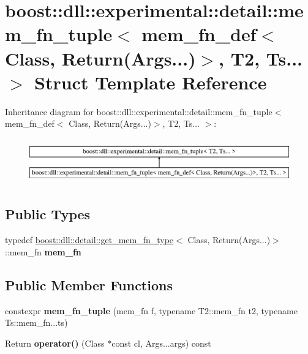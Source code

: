 \hypertarget{a00222}{}\section{boost\+:\+:dll\+:\+:experimental\+:\+:detail\+:\+:mem\+\_\+fn\+\_\+tuple$<$ mem\+\_\+fn\+\_\+def$<$ Class, Return(Args...)$>$, T2, Ts... $>$ Struct Template Reference}
\label{a00222}
Inheritance diagram for boost\+:\+:dll\+:\+:experimental\+:\+:detail\+:\+:mem\+\_\+fn\+\_\+tuple$<$ mem\+\_\+fn\+\_\+def$<$ Class, Return(Args...)$>$, T2, Ts... $>$\+:\begin{figure}[H]
\begin{center}
\leavevmode
\includegraphics[height=2.000000cm]{a00222}
\end{center}
\end{figure}
\subsection*{Public Types}
\begin{DoxyCompactItemize}
\item 
typedef \hyperlink{a00131}{boost\+::dll\+::detail\+::get\+\_\+mem\+\_\+fn\+\_\+type}$<$ Class, Return(Args...)$>$\+::mem\+\_\+fn {\bfseries mem\+\_\+fn}\hypertarget{a00222_a8a4a6f055aa61784e85620d0e4ab854b}{}\label{a00222_a8a4a6f055aa61784e85620d0e4ab854b}

\end{DoxyCompactItemize}
\subsection*{Public Member Functions}
\begin{DoxyCompactItemize}
\item 
constexpr {\bfseries mem\+\_\+fn\+\_\+tuple} (mem\+\_\+fn f, typename T2\+::mem\+\_\+fn t2, typename Ts\+::mem\+\_\+fn...\+ts)\hypertarget{a00222_a788d5aa6a4e7ec5ebbae8bef2c27712e}{}\label{a00222_a788d5aa6a4e7ec5ebbae8bef2c27712e}

\item 
Return {\bfseries operator()} (Class $\ast$const cl, Args...\+args) const \hypertarget{a00222_a2b06e0864fa8c45266aac84a45de6bb6}{}\label{a00222_a2b06e0864fa8c45266aac84a45de6bb6}

\end{DoxyCompactItemize}
